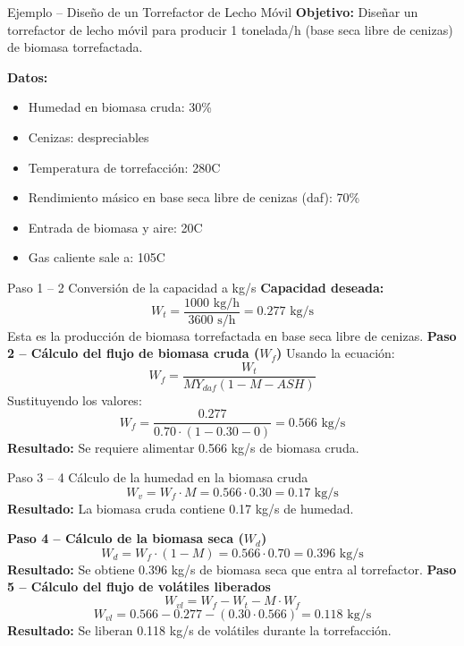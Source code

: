 \documentclass[main.tex]{subfiles}
\begin{document}
\begin{frame}{Ejemplo – Diseño de un Torrefactor de Lecho Móvil}
  \textbf{Objetivo:} Diseñar un torrefactor de lecho móvil para producir 1 tonelada/h (base seca libre de cenizas) de biomasa torrefactada.

  \textbf{Datos:}
  \begin{itemize}
    \item Humedad en biomasa cruda: 30\%
    \item Cenizas: despreciables
    \item Temperatura de torrefacción: 280\textdegree C
    \item Rendimiento másico en base seca libre de cenizas (daf): 70\%
    \item Entrada de biomasa y aire: 20\textdegree C
    \item Gas caliente sale a: 105\textdegree C
  \end{itemize}
\end{frame}

\begin{frame}{Paso 1 – 2 Conversión de la capacidad a kg/s}
  \textbf{Capacidad deseada:}
  \[
    W_t = \frac{1000 \text{ kg/h}}{3600 \text{ s/h}} = 0.277 \text{ kg/s}
  \]
  Esta es la producción de biomasa torrefactada en base seca libre de cenizas.
\textbf{Paso 2 – Cálculo del flujo de biomasa cruda ($W_f$)}
  Usando la ecuación:
  \[
    W_f = \frac{W_t}{MY_{daf}(1 - M - ASH)}
  \]
  Sustituyendo los valores:
  \[
    W_f = \frac{0.277}{0.70 \cdot (1 - 0.30 - 0)} = 0.566 \text{ kg/s}
  \]
  \textbf{Resultado:} Se requiere alimentar 0.566 kg/s de biomasa cruda.
\end{frame}

\begin{frame}{Paso 3 – 4 Cálculo de la humedad en la biomasa cruda}
  \[
    W_v = W_f \cdot M = 0.566 \cdot 0.30 = 0.17 \text{ kg/s}
  \]
  \textbf{Resultado:} La biomasa cruda contiene 0.17 kg/s de humedad.


\textbf{Paso 4 – Cálculo de la biomasa seca ($W_d$)}
  \[
    W_d = W_f \cdot (1 - M) = 0.566 \cdot 0.70 = 0.396 \text{ kg/s}
  \]
  \textbf{Resultado:} Se obtiene 0.396 kg/s de biomasa seca que entra al torrefactor.
\textbf{Paso 5 – Cálculo del flujo de volátiles liberados}
  \[
    W_{vl} = W_f - W_t - M \cdot W_f
  \]
  \[
    W_{vl} = 0.566 - 0.277 - (0.30 \cdot 0.566) = 0.118 \text{ kg/s}
  \]
  \textbf{Resultado:} Se liberan 0.118 kg/s de volátiles durante la torrefacción.
\end{frame}
\end{document}
